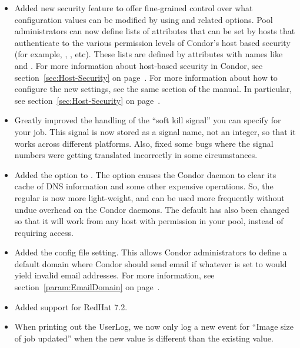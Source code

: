 \begin{itemize}
\item Added new security feature to offer fine-grained control over
what configuration values can be modified by 
using  and related options.
Pool administrators can now define lists of attributes that can be set
by hosts that authenticate to the various permission levels of
Condor's host based security (for example, ,
, etc).
These lists are defined by attributes with names like
 and
. 
For more information about host-based security in Condor, see
section~\ref{sec:Host-Security} on page~\pageref{sec:Host-Security}.
For more information about how to configure the new settings, see the
same section of the manual.
In particular, see section~\ref{sec:Host-Security} on
page~\pageref{sec:Host-Security}. 

\item Greatly improved the handling of the ``soft kill signal'' you
can specify for your job.
This signal is now stored as a signal name, not an integer, so that it
works across different platforms.
Also, fixed some bugs where the signal numbers were getting translated
incorrectly in some circumstances.

\item Added the  option to .
The  option causes the Condor daemon to clear its cache of
DNS information and some other expensive operations.
So, the regular  is now more light-weight, and can
be used more frequently without undue overhead on the Condor daemons. 
The default  has also been changed so that it will
work from any host with  permission in your pool,
instead of requiring  access.

\item Added the  config file setting.
This allows Condor administrators to define a default domain where
Condor should send email if whatever  is set to
would yield invalid email addresses.
For more information, see section~\ref{param:EmailDomain} on
page~\pageref{param:EmailDomain}.

\item
Added support for RedHat 7.2.

\item When printing out the UserLog, we now only log a new event for
``Image size of job updated'' when the new value is different than the
existing value.

\end{itemize}

